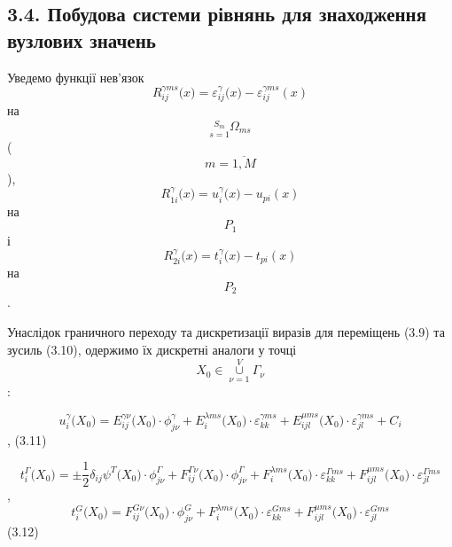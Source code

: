 \hypertarget{ux43fux43eux431ux443ux434ux43eux432ux430-ux441ux438ux441ux442ux435ux43cux438-ux440ux456ux432ux43dux44fux43dux44c-ux434ux43bux44f-ux437ux43dux430ux445ux43eux434ux436ux435ux43dux43dux44f-ux432ux443ux437ux43bux43eux432ux438ux445-ux437ux43dux430ux447ux435ux43dux44c-1}{%
\subsection[3.4. Побудова системи рівнянь для знаходження вузлових
значень
]{\texorpdfstring{\protect\hypertarget{anchor-49}{}{}\protect\hypertarget{anchor-50}{}{}3.4.
Побудова системи рівнянь для знаходження вузлових значень
}{3.4. Побудова системи рівнянь для знаходження вузлових значень }}\label{ux43fux43eux431ux443ux434ux43eux432ux430-ux441ux438ux441ux442ux435ux43cux438-ux440ux456ux432ux43dux44fux43dux44c-ux434ux43bux44f-ux437ux43dux430ux445ux43eux434ux436ux435ux43dux43dux44f-ux432ux443ux437ux43bux43eux432ux438ux445-ux437ux43dux430ux447ux435ux43dux44c-1}}

Уведемо функції нев'язок
\[{R_{\mathit{\text{ij}}}^{\gamma\mathit{\text{ms}}}(x{) = \varepsilon_{\mathit{\text{ij}}}^{\gamma}}(x{) - \varepsilon_{\mathit{\text{ij}}}^{\gamma\mathit{\text{ms}}}}(x)}{}\]
на
\[{\underset{s = 1}{\overset{S_{m}}{}}\Omega_{\mathit{\text{ms}}}}{}\]
(\[{m = \overline{1,M}}{}\]),
\[{R_{1i}^{\gamma}(x{) = u_{i}^{\gamma}}(x{) - u_{\mathit{\text{pi}}}}(x)}{}\]
на \[P_{1}{}\] і
\[{R_{2i}^{\gamma}(x{) = t_{i}^{\gamma}}(x{) - t_{\mathit{\text{pi}}}}(x)}{}\]
на \[P_{2}{}\].

Унаслідок граничного переходу та дискретизації виразів для переміщень
(3.9) та зусиль (3.10), одержимо їх дискретні аналоги у точці
\[{X_{0}{\in\underset{\nu = 1}{\overset{V}{\cup}}\Gamma_{\nu}}}{}\]:

\[{u_{i}^{\gamma}(X_{0}{) = E_{\mathit{\text{ij}}}^{\mathit{\text{γν}}}}(X_{0}{{) \cdot \phi_{\mathit{j\nu}}^{\gamma}} + E_{i}^{\lambda\mathit{\text{ms}}}}(X_{0}{{) \cdot \varepsilon_{\mathit{\text{kk}}}^{\gamma\mathit{\text{ms}}}} + E_{\mathit{\text{ijl}}}^{\mu\mathit{\text{ms}}}}(X_{0}{{) \cdot \varepsilon_{\mathit{\text{jl}}}^{\gamma\mathit{\text{ms}}}} + C_{i}}}{}\],
(3.11)

\[{t_{i}^{\Gamma}(X_{0}{) = {\pm \frac{1}{2}}}\delta_{\mathit{\text{ij}}}\psi^{T}(X_{0}{{) \cdot \phi_{\mathit{j\nu}}^{\Gamma}} + F_{\mathit{\text{ij}}}^{\mathit{\Gamma\nu}}}(X_{0}{{) \cdot \phi_{\mathit{j\nu}}^{\Gamma}} + F_{i}^{\lambda\mathit{\text{ms}}}}(X_{0}{{) \cdot \varepsilon_{\mathit{\text{kk}}}^{\Gamma\mathit{\text{ms}}}} + F_{\mathit{\text{ijl}}}^{\mu\mathit{\text{ms}}}}(X_{0}{) \cdot \varepsilon_{\mathit{\text{jl}}}^{\Gamma\mathit{\text{ms}}}}}{}\],\[{t_{i}^{G}(X_{0}{) = F_{\mathit{\text{ij}}}^{\mathit{G\nu}}}(X_{0}{{) \cdot \phi_{\mathit{j\nu}}^{G}} + F_{i}^{\lambda\mathit{\text{ms}}}}(X_{0}{{) \cdot \varepsilon_{\mathit{\text{kk}}}^{\mathit{\text{Gms}}}} + F_{\mathit{\text{ijl}}}^{\mu\mathit{\text{ms}}}}(X_{0}{) \cdot \varepsilon_{\mathit{\text{jl}}}^{\mathit{\text{Gms}}}}}{}\](3.12)

